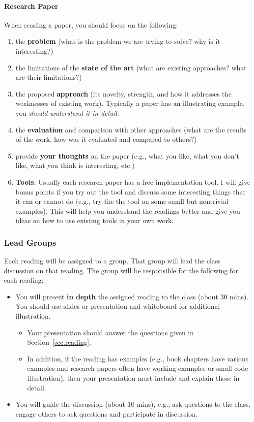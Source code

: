 \documentclass[11pt]{article}
\begin{document}
\paragraph{Research Paper} When reading a paper, you should focus on the following: 
\begin{enumerate}
    \item the \textbf{problem} (what is the problem we are trying to solve? why is it interesting?)
    \item the limitations of the \textbf{state of the art} (what are existing approaches? what are their limitations?)
    \item the proposed \textbf{approach} (its novelty, strength, and how it  addresses the weaknesses of  existing work). Typically a paper has an illustrating example, you \emph{should understand it in detail}.
    \item the \textbf{evaluation} and comparison with other approaches (what are the results of the work, how was it evaluated and compared to others?)
    \item provide \textbf{your thoughts} on the paper (e.g., what you like, what you don't like, what you think is interesting, etc.)
    \item \textbf{\textbf{Tools}}: Usually each research paper has a free implementation
tool. I will give bonus points if you try out the
tool and discuss some interesting things that it can or cannot do
(e.g., try the the tool on some small but nontrivial examples). This
will help you understand the readings better and give you ideas on
how to use existing tools in your own work.
\end{enumerate}
    
\subsubsection{Lead Groups} Each reading will be assigned to a group.  That group will lead the class discussion on that reading. The group will be responsible for the following for each reading:
\begin{itemize}
\item You will present \textbf{\textbf{in depth}} the assigned reading to the class (about 30 mins). You should use slides or presentation and whiteboard for additional illustration.
\begin{itemize}
    \item Your presentation should answer the questions given in Section~\ref{sec:reading}.
    \item In addition, if the reading has examples (e.g., book chapters have various examples and research papers often have working examples or small code illustration), then your presentation must include and explain those in detail.
\end{itemize}
\item You will guide the discussion (about 10 mins), e.g., ask questions to the class, engage others to ask questions and participate in discussion.


\end{itemize}
\end{document}
